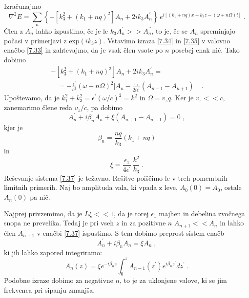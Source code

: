 \documentclass[11pt,fleqn]{book} %
\begin{document}
Izračunajmo 
\begin{equation}
\nabla^{2}E=\sum_{n}\left\{ -[k_{3}^{2}+(k_{1}+nq)^{2}]A_{n}+2ik_{3}A_{n}^{\prime}\right\} \, e^{i[(k_{1}+nq)x+k_{3}z-(\omega+n\Omega)t]}\;.\label{7.35}
\end{equation}
 Člen z $A_{n}^{\prime\prime}$ lahko izpustimo, če je le $k_{3}A_{n}^{\prime}>>A_{n}^{\prime\prime}$,
to je, če se $A_{n}$ spreminjajo počasi v primerjavi z exp$(ik_{3}z)$.
Vstavimo izraza \ref{7.34} in \ref{7.35} v valovno enačbo \ref{7.33}
in zahtevajmo, da je vsak člen vsote po $n$ posebej enak nič. Tako
dobimo 
\begin{eqnarray}
-[k_{3}^{2}+(k_{1}+nq)^{2}]A_{n}+2ik_{3}A_{n}^{\prime}=\nonumber \\
\quad=-\frac{\epsilon^{\prime}}{c^{2}}(\omega+n\Omega)^{2}[A_{n}-\frac{\epsilon_{1}}{2i\epsilon^{\prime}}(A_{n-1}-A_{n+1}) & \;.
\end{eqnarray}
 Upoštevamo, da je $k_{1}^{2}+k_{3}^{2}=\epsilon^{\prime}(\omega/c)^{2}=k^{2}$
in $\Omega=v_{z}q$. Ker je $v_{z}<<c$, zanemarimo člene reda $v_{z}/c$,
pa dobimo 
\begin{equation}
A_{n}^{\prime}+i\beta_{n}A_{n}+\xi(A_{n+1}-A_{n-1})=0\;,\label{7.37}
\end{equation}
 kjer je 
\begin{equation}
\beta_{n}=\frac{nq}{k_{3}}(k_{1}+nq)\label{7.38}
\end{equation}
 in 
\begin{equation}
\xi=\frac{\epsilon_{1}}{4\epsilon^{\prime}}\,\frac{k^{2}}{k_{3}}\;.\label{7.39}
\end{equation}
 Reševanje sistema \ref{7.37} je težavno. Rešitve poiščimo le v treh
pomembnih limitnih primerih. Naj bo amplituda vala, ki vpada z leve,
$A_{0}(0)=A_{0}$, ostale $A_{n}(0)$ pa nič.

Najprej privzemimo, da je $L\xi<<1$, da je torej $\epsilon_{1}$
majhen in debelina zvočnega snopa ne prevelika. Tedaj je pri vseh
$z$ in za pozitivne $n$ $A_{n+1}<<A_{n}$ in lahko člen $A_{n+1}$
v enačbi \ref{7.37} ispustimo. S tem dobimo preprost sistem enačb
\begin{equation}
A_{n}^{\prime}+i\beta_{n}A_{n}=\xi A_{n}\;,\label{7.40}
\end{equation}
 ki jih lahko zapored integriramo: 
\begin{equation}
A_{n}(z)=\xi e^{-i\beta_{n}z}\int_{0}^{z}A_{n-1}(z^{\prime})e^{i\beta_{n}z^{\prime}}dz^{\prime}\;.\label{7.41}
\end{equation}
 Podobne izraze dobimo za negativne $n$, to je za uklonjene valove,
ki se jim frekvenca pri sipanju zmanjša.
\end{document}

